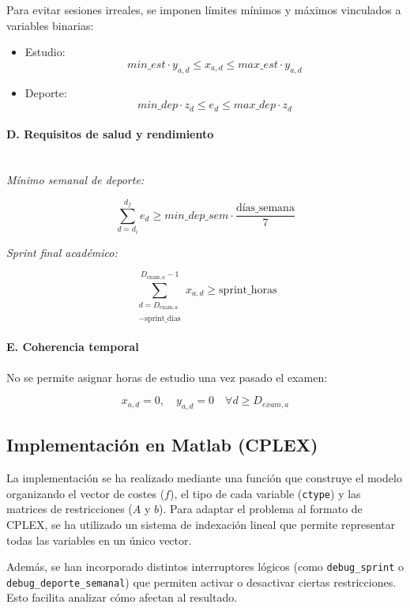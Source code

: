 \documentclass{article}
\begin{document}
Para evitar sesiones irreales, se imponen límites mínimos y máximos vinculados a variables binarias:

\begin{itemize}
    \item Estudio:
    \[
    min\_est \cdot y_{a,d} \leq x_{a,d} \leq max\_est \cdot y_{a,d}
    \]
    \item Deporte:
    \[
    min\_dep \cdot z_d \leq e_d \leq max\_dep \cdot z_d
    \]
\end{itemize}

\paragraph{D. Requisitos de salud y rendimiento}\mbox{}\\

\textit{Mínimo semanal de deporte:}

\[
\sum_{d=d_i}^{d_f} e_d \geq min\_dep\_sem \cdot \frac{\text{días\_semana}}{7}
\]

\textit{Sprint final académico:}

\[
\sum_{\substack{d = D_{\mathrm{exam},a} \\ - \mathrm{sprint\_dias}}}^{D_{\mathrm{exam},a} - 1} x_{a,d} \geq \mathrm{sprint\_horas}
\]

\paragraph{E. Coherencia temporal}

No se permite asignar horas de estudio una vez pasado el examen:

\[
x_{a,d} = 0, \quad y_{a,d} = 0 
\quad \forall d \geq D_{exam,a}
\]

\subsection{Implementación en Matlab (CPLEX)}

La implementación se ha realizado mediante una función que construye el modelo organizando el vector de costes ($f$), el tipo de cada variable (\texttt{ctype}) y las matrices de restricciones ($A$ y $b$).
Para adaptar el problema al formato de CPLEX, se ha utilizado un sistema de indexación lineal que permite representar todas las variables en un único vector.
\vspace{0.5cm}

Además, se han incorporado distintos interruptores lógicos (como \texttt{debug\_sprint} o \texttt{debug\_deporte\_semanal}) que permiten activar o desactivar ciertas restricciones. Esto facilita analizar cómo afectan al resultado.
\end{document}

